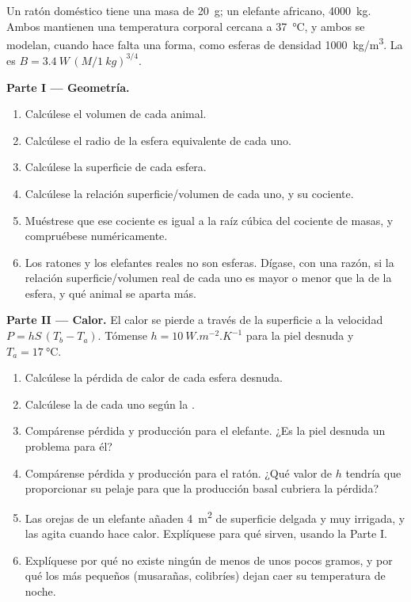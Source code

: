 \begin{problem}
\label{pb:b1:organism-environment:1}
Un ratón doméstico tiene una masa de \qty{20}{g}; un elefante africano,
\qty{4000}{kg}. Ambos mantienen una temperatura corporal cercana a
\qty{37}{\celsius}, y ambos se modelan, cuando hace falta una forma, como
esferas de densidad \qty{1000}{kg/m^3}. La  es
$B = \qty{3.4}{W}\,(M/\qty{1}{kg})^{3/4}$.

\medskip
\noindent\textbf{Parte I --- Geometría.}
\begin{enumerate}
  \item Calcúlese el volumen de cada animal.
  \item Calcúlese el radio de la esfera equivalente de cada uno.
  \item Calcúlese la superficie de cada esfera.
  \item Calcúlese la relación superficie/volumen de cada uno, y su cociente.
  \item Muéstrese que ese cociente es igual a la raíz cúbica del cociente
        de masas, y compruébese numéricamente.
  \item Los ratones y los elefantes reales no son esferas. Dígase, con una
        razón, si la relación superficie/volumen real de cada uno es mayor
        o menor que la de la esfera, y qué animal se aparta más.
\end{enumerate}

\medskip
\noindent\textbf{Parte II --- Calor.}
El calor se pierde a través de la superficie a la velocidad
$P = hS\,(T_b - T_a)$. Tómense $h = \qty{10}{W.m^{-2}.K^{-1}}$ para la piel
desnuda y $T_a =
\qty{17}{\celsius}$.
\begin{enumerate}[resume]
  \item Calcúlese la pérdida de calor de cada esfera desnuda.
  \item Calcúlese la  de cada uno según la .
  \item Compárense pérdida y producción para el elefante. ¿Es la piel
        desnuda un problema para él?
  \item Compárense pérdida y producción para el ratón. ¿Qué valor de $h$
        tendría que proporcionar su pelaje para que la producción basal
        cubriera la pérdida?
  \item Las orejas de un elefante añaden \qty{4}{m^2} de superficie
        delgada y muy irrigada, y las agita cuando hace calor. Explíquese
        para qué sirven, usando la Parte I.
  \item Explíquese por qué no existe ningún  de menos de unos
        pocos gramos, y por qué los más pequeños (musarañas, colibríes)
        dejan caer su temperatura de noche.
\end{enumerate}


\end{problem}
